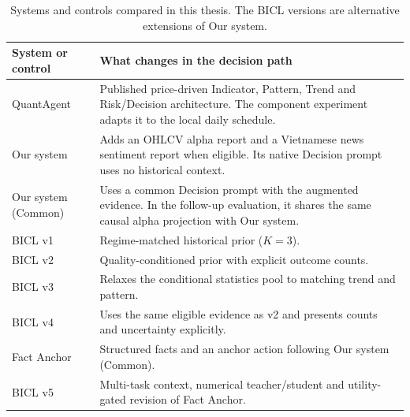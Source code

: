 \begin{table}[!htb]\centering\small
\caption[Systems and baselines]{Systems and controls compared in this thesis. The BICL versions are alternative extensions of Our system.}\label{tab:system-versions}
\begin{tabular}{@{}lP{.70\linewidth}@{}}\toprule
System or control & What changes in the decision path \\ \midrule
QuantAgent & Published price-driven Indicator, Pattern, Trend and Risk/Decision architecture. The component experiment adapts it to the local daily schedule. \\
Our system & Adds an OHLCV alpha report and a Vietnamese news sentiment report when eligible. Its native Decision prompt uses no historical context. \\
Our system (Common) & Uses a common Decision prompt with the augmented evidence. In the follow-up evaluation, it shares the same causal alpha projection with Our system. \\
BICL v1 & Regime-matched historical prior ($K=3$). \\
BICL v2 & Quality-conditioned prior with explicit outcome counts. \\
BICL v3 & Relaxes the conditional statistics pool to matching trend and pattern. \\
BICL v4 & Uses the same eligible evidence as v2 and presents counts and uncertainty explicitly. \\
Fact Anchor & Structured facts and an anchor action following Our system (Common). \\
BICL v5 & Multi-task context, numerical teacher/student and utility-gated revision of Fact Anchor. \\
\bottomrule\end{tabular}
\end{table}
